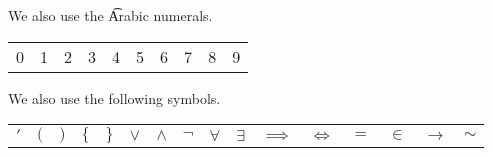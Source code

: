 
We also use the \t{Arabic numerals}.
\begin{center}
\begin{tabular}{cccccccccc}
  0 & 1 & 2 & 3 & 4 & 5 & 6 & 7 & 8 & 9\\
\end{tabular}
\end{center}


We also use the following symbols.
\begin{center}
\begin{tabular}{cccccccccccccccc}
  $'$ & $($ & $)$ & $\{$ & $\}$ & $\lor$ & $\land$ & $\neg$ & $\forall$ & $\exists$ & $\implies$ & $\iff$ & $=$ & $\in$ & $\to$ & $\sim$
\end{tabular}
\end{center}
